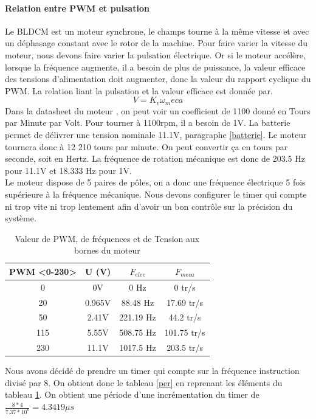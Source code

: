 			\paragraph{Relation entre PWM et pulsation}
			Le BLDCM est un moteur synchrone, le champs tourne à la même vitesse et avec un déphasage constant avec le rotor de la machine. Pour faire varier la vitesse du moteur, nous devons faire varier la pulsation électrique. Or si le moteur accélère, lorsque la fréquence augmente, il a besoin de plus de puissance, la valeur efficace des tensions d'alimentation doit augmenter, donc la valeur du rapport cyclique du PWM. La relation liant la pulsation et la valeur efficace est donnée par.
			$$V=K_v \omega_meca$$
			Dans la datasheet du moteur \cite{moteur}, on peut voir un coefficient de 1100 donné en Tours par Minute par Volt.
			Pour tourner à 1100rpm, il a besoin de 1V. La batterie permet de délivrer une tension nominale 11.1V, paragraphe \ref{batterie}. Le moteur tournera donc à 12 210 tours par minute. On peut convertir ça en tours par seconde, soit en Hertz. La fréquence de rotation mécanique est donc de 203.5 Hz pour 11.1V et 18.333 Hz pour 1V.\\
			Le moteur dispose de 5 paires de pôles, on a donc une fréquence électrique 5 fois supérieure à la fréquence mécanique.
			Nous devons configurer le timer qui compte ni trop vite ni trop lentement afin d'avoir un bon contrôle sur la précision du système.\\
			\begin{table}[h]
						\centering
			\begin{tabular}{|c|c|c|c|}
			PWM <0-230> & U (V) & $F_{elec}$ & $F_{meca}$ \\ 
			\hline 
			0 & 0V & 0 Hz & 0 tr/s \\ 
			20 & 0.965V &  88.48 Hz & 17.69 tr/s \\ 
			50 & 2.41V &  221.19 Hz & 44.2 tr/s \\ 
			115 & 5.55V & 508.75 Hz & 101.75 tr/s \\ 
			230 & 11.1V & 1017.5 Hz & 203.5 tr/s \\ 
			\end{tabular} 
			\caption{Valeur de PWM, de fréquences et de Tension aux bornes du moteur}
			\label{freqPWMVitesse}
			\end{table}
			Nous avons décidé de prendre un timer qui compte sur la fréquence instruction divisé par 8. On obtient donc le tableau \ref{per} en reprenant les éléments du tableau \ref{freqPWMVitesse}. On obtient une période d'une incrémentation du timer de $\frac{8*4}{7.37*10^6}=4.3419 \mu s $ \\
